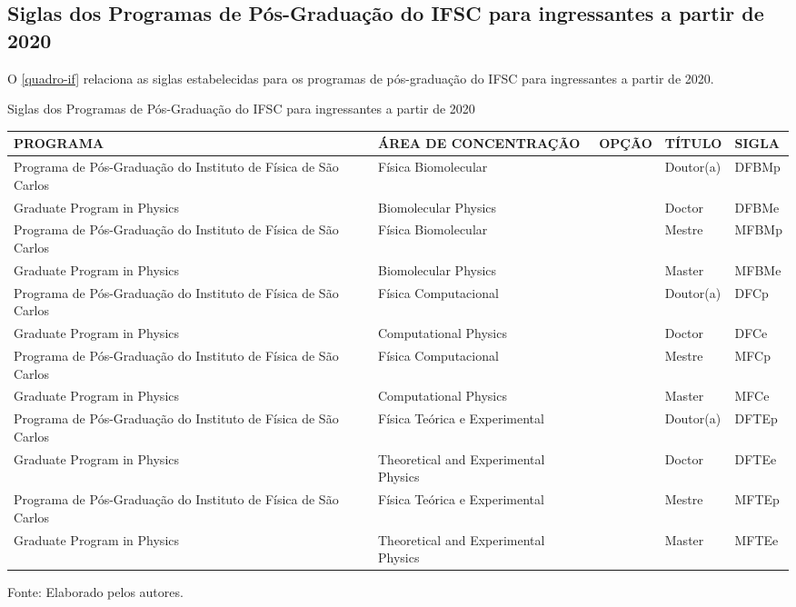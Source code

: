 \begin{apendicesenv}
\chapter{Siglas dos Programas de Pós-Graduação do IFSC para ingressantes a partir de 2020}
O \autoref{quadro-if} relaciona as siglas estabelecidas para os programas de pós-graduação do IFSC para ingressantes a partir de 2020.
\begin{quadro}[htb] 
	\ABNTEXfontereduzida
	\caption[Siglas dos Programas de Pós-Graduação do IFSC para ingressantes a partir de 2020]{Siglas dos Programas de Pós-Graduação do IFSC para ingressantes a partir de 2020}
	\label{quadro-if}
	\begin{tabular}{|p{4.5cm}|p{4.0cm}|p{2.0cm}|p{1.5cm}|p{2.25cm}|}
		\hline
		\textbf{PROGRAMA} & \textbf{ÁREA DE CONCENTRAÇÃO} & \textbf{OPÇÃO} & \textbf{TÍTULO} & \textbf{SIGLA}  \\
		\hline
		Programa de Pós-Graduação do Instituto de Física de São Carlos & Física Biomolecular &  & Doutor(a) & DFBMp\\
		Graduate Program in Physics & Biomolecular Physics &  & Doctor & DFBMe\\
		Programa de Pós-Graduação do Instituto de Física de São Carlos & Física Biomolecular &  & Mestre & MFBMp\\		
		Graduate Program in Physics & Biomolecular Physics &  & Master & MFBMe\\
		Programa de Pós-Graduação do Instituto de Física de São Carlos & Física Computacional &  & Doutor(a) & DFCp\\
		Graduate Program in Physics & Computational Physics &  & Doctor & DFCe\\
		Programa de Pós-Graduação do Instituto de Física de São Carlos & Física Computacional &  & Mestre & MFCp\\		
		Graduate Program in Physics & Computational Physics &  & Master & MFCe\\
		Programa de Pós-Graduação do Instituto de Física de São Carlos & Física Teórica e Experimental &  & Doutor(a) & DFTEp\\		
		Graduate Program in Physics & Theoretical and Experimental Physics &  & Doctor & DFTEe\\
		Programa de Pós-Graduação do Instituto de Física de São Carlos & Física Teórica e Experimental &  & Mestre & MFTEp\\
		Graduate Program in Physics & Theoretical and Experimental Physics &  & Master & MFTEe\\
		\hline
	\end{tabular}
	\begin{flushleft}
		Fonte: Elaborado pelos autores.\
	\end{flushleft}
\end{quadro}


\end{apendicesenv}

